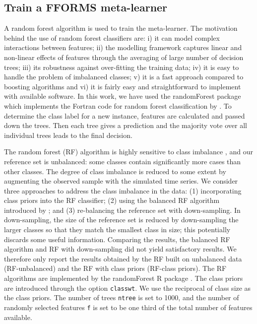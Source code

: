 \documentclass[11pt,a4paper,]{article}
\begin{document}
\hypertarget{train-a-fforms-meta-learner}{%
\subsection{Train a FFORMS meta-learner}\label{train-a-fforms-meta-learner}}

A random forest algorithm is used to train the meta-learner. The motivation behind the use of random forest classifiers are: i) it can model complex interactions between features; ii) the modelling framework captures linear and non-linear effects of features through the averaging of large number of decision trees; iii) its robustness against over-fitting the training data; iv) it is easy to handle the problem of imbalanced classes; v) it is a fast approach compared to boosting algorithms and vi) it is fairly easy and straightforward to implement with available software. In this work, we have used the randomForest package \autocites{liaw2002randomforest}{rfpkg} which implements the Fortran code for random forest classification by \textcite{breiman2004random}.
To determine the class label for a new instance, features are calculated and passed down the trees. Then each tree gives a prediction and the majority vote over all individual trees leads to the final decision.

The random forest (RF) algorithm is highly sensitive to class imbalance \autocite{breiman2001random}, and our reference set is unbalanced: some classes contain significantly more cases than other classes. The degree of class imbalance is reduced to some extent by augmenting the observed sample with the simulated time series. We consider three approaches to address the class imbalance in the data: (1) incorporating class priors into the RF classifier; (2) using the balanced RF algorithm introduced by \textcite{chen2004using}; and (3) re-balancing the reference set with down-sampling. In down-sampling, the size of the reference set is reduced by down-sampling the larger classes so that they match the smallest class in size; this potentially discards some useful information. Comparing the results, the balanced RF algorithm and RF with down-sampling did not yield satisfactory results. We therefore only report the results obtained by the RF built on unbalanced data (RF-unbalanced) and the RF with class priors (RF-class priors). The RF algorithms are implemented by the randomForest R package \autocites{liaw2002randomforest}{rfpkg}. The class priors are introduced through the option \texttt{classwt}. We use the reciprocal of class size as the class priors. The number of trees \texttt{ntree} is set to 1000, and the number of randomly selected features \texttt{f} is set to be one third of the total number of features available.
\end{document}
